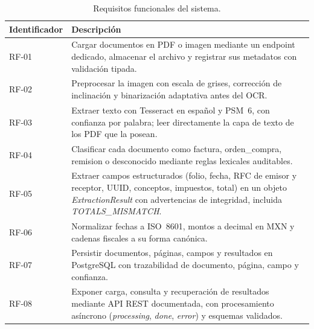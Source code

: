 \begin{table}[H]
\centering
\small
\caption{Requisitos funcionales del sistema.}
\label{tab:requisitos_funcionales}
\begin{tabular}{@{}p{2.8cm}p{10.7cm}@{}}
\toprule
\textbf{Identificador} & \textbf{Descripción} \\
\midrule
RF-01 & Cargar documentos en PDF o imagen mediante un endpoint dedicado, almacenar el archivo y registrar sus metadatos con validación tipada\cite{fastapi_docs, pydantic_v2_2024}. \\
RF-02 & Preprocesar la imagen con escala de grises, corrección de inclinación y binarización adaptativa antes del OCR\cite{bradski_opencv_2008, opencv_docs}. \\
RF-03 & Extraer texto con Tesseract en español y PSM~6, con confianza por palabra; leer directamente la capa de texto de los PDF que la posean\cite{tesseract_ocr, smith_tesseract_2007}. \\
RF-04 & Clasificar cada documento como factura, orden\_compra, remision o desconocido mediante reglas lexicales auditables\cite{sokolova_metrics_2009}. \\
RF-05 & Extraer campos estructurados (folio, fecha, RFC de emisor y receptor, UUID, conceptos, impuestos, total) en un objeto \textit{ExtractionResult} con advertencias de integridad, incluida \textit{TOTALS\_MISMATCH}\cite{structured_extraction_2023}. \\
RF-06 & Normalizar fechas a ISO~8601, montos a decimal en MXN y cadenas fiscales a su forma canónica\cite{pydantic_v2_2024}. \\
RF-07 & Persistir documentos, páginas, campos y resultados en PostgreSQL con trazabilidad de documento, página, campo y confianza\cite{postgres_docs_2024, sqlalchemy_docs_2024}. \\
RF-08 & Exponer carga, consulta y recuperación de resultados mediante API REST documentada, con procesamiento asíncrono (\textit{processing}, \textit{done}, \textit{error}) y esquemas validados\cite{fielding_rest_2000, fastapi_docs}. \\
\bottomrule
\end{tabular}
\end{table}


